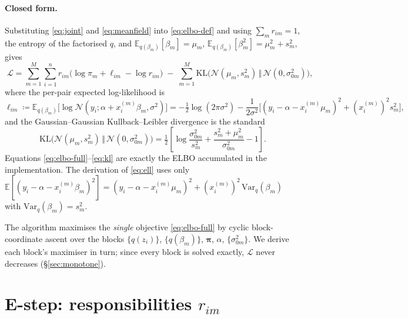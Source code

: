 \documentclass[11pt]{article}
\newcommand{\E}{\mathbb{E}}
\newcommand{\KL}{\mathrm{KL}}
\newcommand{\Nor}{\mathcal{N}}
\newcommand{\sigsq}{\sigma^{2}}
\newcommand{\sigz}[1]{\sigma_{0#1}^{2}}
\newcommand{\xim}{x_i^{(m)}}
\newcommand{\half}{\tfrac{1}{2}}
\theoremstyle{plain}
\theoremstyle{remark}
\begin{document}
\paragraph{Closed form.} Substituting \eqref{eq:joint} and \eqref{eq:meanfield}
into \eqref{eq:elbo-def} and using $\sum_m r_{im}=1$, the entropy of the
factorised $q$, and $\E_{q(\beta_m)}[\beta_m]=\mu_m$,
$\E_{q(\beta_m)}[\beta_m^2]=\mu_m^2+s_m^2$, gives
\begin{equation}\label{eq:elbo-full}
\boxed{\;
  \mathcal L
  =\sum_{m=1}^{M}\sum_{i=1}^{n} r_{im}\Big(\log\pi_m + \ell_{im}-\log r_{im}\Big)
   \;-\;\sum_{m=1}^{M}\KL\!\big(\Nor(\mu_m,s_m^2)\,\Vert\,\Nor(0,\sigz{m})\big),
\;}
\end{equation}
where the per-pair expected log-likelihood is
\begin{equation}\label{eq:ell}
  \ell_{im}
  \coloneqq \E_{q(\beta_m)}\!\big[\log\Nor(y_i;\alpha+\xim\beta_m,\sigsq)\big]
  =-\half\log(2\pi\sigsq)
   -\frac{1}{2\sigsq}\Big[(y_i-\alpha-\xim\mu_m)^2+(\xim)^2 s_m^2\Big],
\end{equation}
and the Gaussian--Gaussian Kullback--Leibler divergence is the standard
\begin{equation}\label{eq:kl}
  \KL\!\big(\Nor(\mu_m,s_m^2)\,\Vert\,\Nor(0,\sigz{m})\big)
  =\half\!\left[\log\frac{\sigz{m}}{s_m^2}
     +\frac{s_m^2+\mu_m^2}{\sigz{m}}-1\right].
\end{equation}
Equations \eqref{eq:elbo-full}--\eqref{eq:kl} are exactly the ELBO accumulated in
the implementation. The derivation of \eqref{eq:ell} uses only
$\E[(y_i-\alpha-\xim\beta_m)^2]=(y_i-\alpha-\xim\mu_m)^2+(\xim)^2\,\mathrm{Var}_q(\beta_m)$
with $\mathrm{Var}_q(\beta_m)=s_m^2$.

The algorithm maximises the \emph{single} objective \eqref{eq:elbo-full} by
cyclic block-coordinate ascent over the blocks
$\{q(z_i)\}$, $\{q(\beta_m)\}$, $\bm\pi$, $\alpha$, $\{\sigz{m}\}$. We derive each
block's maximiser in turn; since every block is solved exactly, $\mathcal L$
never decreases (\S\ref{sec:monotone}).

\section{E-step: responsibilities $r_{im}$}\label{sec:estep}
\end{document}
